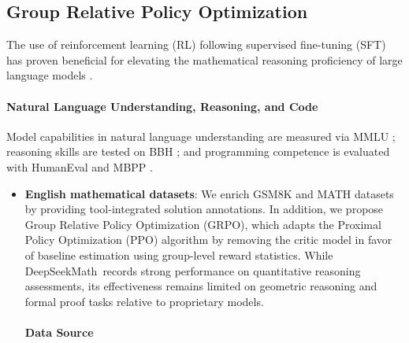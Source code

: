 \begin{itemize}[topsep=0pt]
\subsection{Group Relative Policy Optimization} The use of reinforcement learning (RL) following supervised fine-tuning (SFT) has proven beneficial for elevating the mathematical reasoning proficiency of large language models \citep{wang2023math,wizardmath}. \paragraph{Natural Language Understanding, Reasoning, and Code}

Model capabilities in natural language understanding are measured via MMLU \citep{mmlu}; reasoning skills are tested on BBH \citep{bbh}; and programming competence is evaluated with HumanEval \citep{codex} and MBPP \citep{mbpp}. \begin{itemize}[topsep=0pt]
    \item \textbf{English mathematical datasets}: We enrich GSM8K and MATH datasets by providing tool-integrated solution annotations. In addition, we propose Group Relative Policy Optimization (GRPO), which adapts the Proximal Policy Optimization (PPO) algorithm \citep{schulman2017proximal} by removing the critic model in favor of baseline estimation using group-level reward statistics. While DeepSeekMath~records strong performance on quantitative reasoning assessments, its effectiveness remains limited on geometric reasoning and formal proof tasks relative to proprietary models. \paragraph{Data Source}  

\end{itemize}
\end{itemize}
